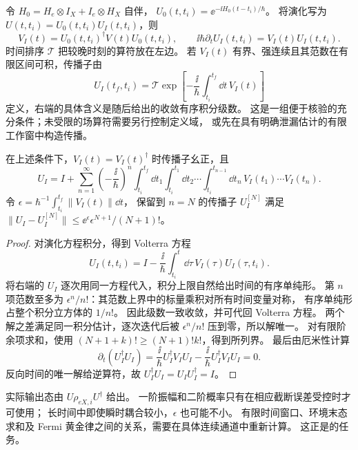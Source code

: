 \begin{definition}[传播子与相互作用绘景]
令 $H_0=H_e\otimes I_X+I_e\otimes H_X$ 自伴，
$U_0(t,t_i)=\ee^{-\ii H_0(t-t_i)/\hbar}$。
将演化写为 $U(t,t_i)=U_0(t,t_i)U_I(t,t_i)$，则
\[
V_I(t)=U_0(t,t_i)^\dagger V(t)U_0(t,t_i),\qquad
\ii\hbar\partial_tU_I(t,t_i)=V_I(t)U_I(t,t_i).
\]
时间排序 $\mathcal T$ 把较晚时刻的算符放在左边。
若 $V_I(t)$ 有界、强连续且其范数在有限区间可积，传播子由
\begin{equation}
U_I(t_f,t_i)=\mathcal T\exp\!\left[-\frac{\ii}{\hbar}\int_{t_i}^{t_f}\dd t\,V_I(t)\right]
\label{eq:feqo-primer-dyson}
\end{equation}
定义，右端的具体含义是随后给出的收敛有序积分级数。
这是一组便于核验的充分条件；未受限的场算符需要另行控制定义域，
或先在具有明确泄漏估计的有限工作窗中构造传播。
\end{definition}

\begin{theorem}
在上述条件下，$V_I(t)=V_I(t)^\dagger$ 时传播子幺正，且
\begin{equation}
U_I=I+\sum_{n=1}^{\infty}\left(-\frac{\ii}{\hbar}\right)^n
\int_{t_i}^{t_f}\dd t_1\int_{t_i}^{t_1}\dd t_2\cdots
\int_{t_i}^{t_{n-1}}\dd t_n\,V_I(t_1)\cdots V_I(t_n).
\label{eq:feqo-primer-dyson-series}
\end{equation}
令 $\epsilon=\hbar^{-1}\int_{t_i}^{t_f}\|V_I(t)\|\dd t$，
保留到 $n=N$ 的传播子 $U_I^{[N]}$ 满足
$\|U_I-U_I^{[N]}\|\le\ee^\epsilon\epsilon^{N+1}/(N+1)!$。
\end{theorem}
\begin{proof}
对演化方程积分，得到 Volterra 方程
\[
U_I(t,t_i)=I-\frac{\ii}{\hbar}\int_{t_i}^{t}\dd\tau\,V_I(\tau)U_I(\tau,t_i).
\]
将右端的 $U_I$ 逐次用同一方程代入，积分上限自然给出时间的有序单纯形。
第 $n$ 项范数至多为 $\epsilon^n/n!$：其范数上界中的标量乘积对所有时间变量对称，
有序单纯形占整个积分立方体的 $1/n!$。
因此级数一致收敛，并可代回 Volterra 方程。
两个解之差满足同一积分估计，逐次迭代后被 $\epsilon^n/n!$ 压到零，所以解唯一。
对有限阶余项求和，使用
$(N+1+k)!\ge(N+1)!k!$，得到所列界。
最后由厄米性计算
\[
\partial_t(U_I^\dagger U_I)
=\frac{\ii}{\hbar}U_I^\dagger V_IU_I
-\frac{\ii}{\hbar}U_I^\dagger V_IU_I=0.
\]
反向时间的唯一解给逆算符，故 $U_I^\dagger U_I=U_IU_I^\dagger=I$。
\end{proof}

实际输出态由 $U\rho_{eX,i}U^\dagger$ 给出。
一阶振幅和二阶概率只有在相应截断误差受控时才可使用；
长时间中即使瞬时耦合较小，$\epsilon$ 也可能不小。
有限时间窗口、环境末态求和及 Fermi 黄金律之间的关系，需要在具体连续通道中重新计算。
这正是的任务。

